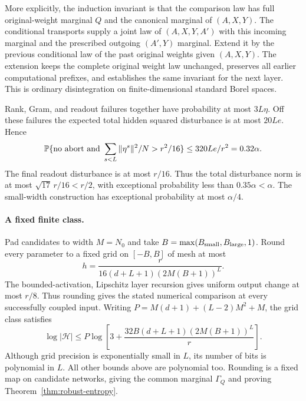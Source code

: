 More explicitly, the induction invariant is that the comparison law has
full original-weight marginal $Q$ and the canonical marginal of
$(A,X,Y)$. The conditional transports supply a joint law of
$(A,X,Y,A')$ with this incoming marginal and the prescribed outgoing
$(A',Y)$ marginal. Extend it by the previous conditional law of the past
original weights given $(A,X,Y)$. The extension keeps the complete original
weight law unchanged, preserves all earlier computational prefixes, and
establishes the same invariant for the next layer. This is ordinary
disintegration on finite-dimensional standard Borel spaces.

Rank, Gram, and readout failures together have probability at most
$3L\eta$. Off these failures the expected total hidden squared disturbance
is at most $20Le$. Hence
\[
 \mathbb P\{\text{no abort and }\sum_{s<L}\|\eta^s\|^2/N>r^2/16\}
 \le320Le/r^2=0.32\alpha.
\]
The final readout disturbance is at most $r/16$. Thus the total disturbance
norm is at most $\sqrt{17}\,r/16<r/2$, with exceptional probability less
than $0.35\alpha<\alpha$. The small-width construction has exceptional
probability at most $\alpha/4$.

\paragraph{A fixed finite class.}
Pad candidates to width $M=N_0$ and take
$B=\max(B_{\rm small},B_{\rm large},1)$. Round every parameter to a fixed
grid on $[-B,B]$ of mesh at most
\[
 h=\frac{r}{16(d+L+1)(2M(B+1))^L}.
\]
The bounded-activation, Lipschitz layer recursion gives uniform output change
at most $r/8$. Thus rounding gives the stated numerical comparison at every
successfully coupled input.
Writing $P=M(d+1)+(L-2)M^2+M$, the grid class satisfies
\[
 \log|\mathcal H|\le
 P\log\left[3+\frac{32B(d+L+1)(2M(B+1))^L}{r}\right].
\]
Although grid precision is exponentially small in $L$, its number of bits is
polynomial in $L$. All other bounds above are polynomial too. Rounding is a
fixed map on candidate networks, giving the common marginal $\Gamma_Q$ and
proving Theorem~\ref{thm:robust-entropy}.
